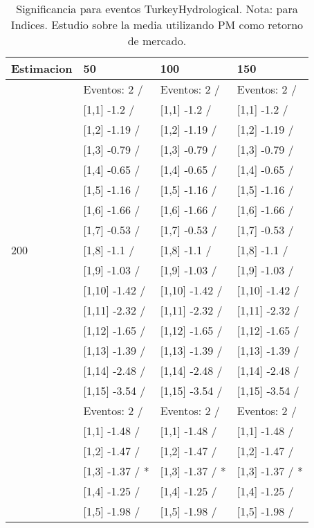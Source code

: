 \begin{table}

\caption{Significancia para eventos TurkeyHydrological. Nota: para Indices. Estudio sobre la media utilizando PM como retorno de mercado.}
\centering
\begin{tabular}[t]{llll}
\toprule
Estimacion & 50 & 100 & 150\\
\midrule
 & Eventos:  2 / & Eventos:  2 / & Eventos:  2 /\\
 & {}[1,1] -1.2  / & {}[1,1] -1.2  / & {}[1,1] -1.2  /\\
 & {}[1,2] -1.19  / & {}[1,2] -1.19  / & {}[1,2] -1.19  /\\
 & {}[1,3] -0.79  / & {}[1,3] -0.79  / & {}[1,3] -0.79  /\\
 & {}[1,4] -0.65  / & {}[1,4] -0.65  / & {}[1,4] -0.65  /\\
\addlinespace
 & {}[1,5] -1.16  / & {}[1,5] -1.16  / & {}[1,5] -1.16  /\\
 & {}[1,6] -1.66  / & {}[1,6] -1.66  / & {}[1,6] -1.66  /\\
 & {}[1,7] -0.53  / & {}[1,7] -0.53  / & {}[1,7] -0.53  /\\
200 & {}[1,8] -1.1  / & {}[1,8] -1.1  / & {}[1,8] -1.1  /\\
 & {}[1,9] -1.03  / & {}[1,9] -1.03  / & {}[1,9] -1.03  /\\
\addlinespace
 & {}[1,10] -1.42  / & {}[1,10] -1.42  / & {}[1,10] -1.42  /\\
 & {}[1,11] -2.32  / & {}[1,11] -2.32  / & {}[1,11] -2.32  /\\
 & {}[1,12] -1.65  / & {}[1,12] -1.65  / & {}[1,12] -1.65  /\\
 & {}[1,13] -1.39  / & {}[1,13] -1.39  / & {}[1,13] -1.39  /\\
 & {}[1,14] -2.48  / & {}[1,14] -2.48  / & {}[1,14] -2.48  /\\
\addlinespace
 & {}[1,15] -3.54  / & {}[1,15] -3.54  / & {}[1,15] -3.54  /\\
 & Eventos:  2 / & Eventos:  2 / & Eventos:  2 /\\
 & {}[1,1] -1.48  / & {}[1,1] -1.48  / & {}[1,1] -1.48  /\\
 & {}[1,2] -1.47  / & {}[1,2] -1.47  / & {}[1,2] -1.47  /\\
 & {}[1,3] -1.37  / * & {}[1,3] -1.37  / * & {}[1,3] -1.37  / *\\
\addlinespace
 & {}[1,4] -1.25  / & {}[1,4] -1.25  / & {}[1,4] -1.25  /\\
 & {}[1,5] -1.98  / & {}[1,5] -1.98  / & {}[1,5] -1.98  /\\

\end{tabular}
\end{table}
